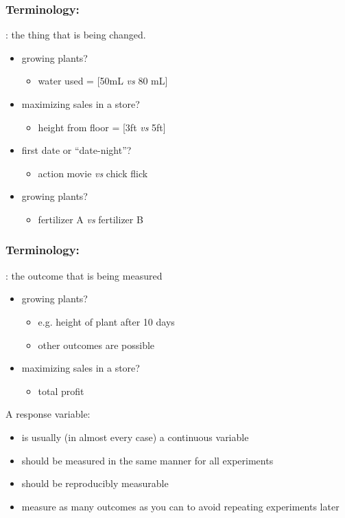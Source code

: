 \begin{frame}\frametitle{Terminology: {\color{purple}{Factors}}}
	{\color{purple}{Factor}}: the thing that is being changed.
	
	\begin{itemize}
		\item	growing plants? 
			\begin{itemize}
				\item	water used = [50mL \emph{vs} 80 mL]
			\end{itemize}
		\item	maximizing sales in a store? 
			\begin{itemize}
				\item	height from floor = [3ft \emph{vs} 5ft]
			\end{itemize}
		\item	first date or ``date-night''?
			\begin{itemize}
				\item	action movie \emph{vs} chick flick
			\end{itemize}
		\item	growing plants?
			\begin{itemize}
				\item	fertilizer A \emph{vs} fertilizer B
			\end{itemize}
	\end{itemize}
\end{frame}

\begin{frame}\frametitle{Terminology: {\color{purple}{Response}}}
	{\color{purple}{Response}}: the outcome that is being measured
	\begin{itemize}
		\item	growing plants? 
			\begin{itemize}
				\item	e.g. height of plant after 10 days
				\item	other outcomes are possible
			\end{itemize}
		\item	maximizing sales in a store? 
			\begin{itemize}
				\item	total profit
			\end{itemize}
	\end{itemize}
	
	\vspace{12pt}
	A response variable:
	\begin{itemize}
		\item	is usually (in almost every case) a continuous variable
		\item	should be measured in the same manner for all experiments
		\item	should be reproducibly measurable
		\item	measure as many outcomes as you can to avoid repeating experiments later
	\end{itemize}	
\end{frame}

